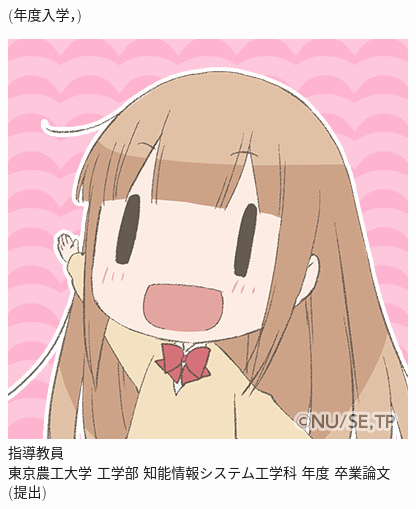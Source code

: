 \documentclass[main]{subfiles}
\begin{document}
\begin{titlepage}
    \centering
    ~\\[10mm]
    {\LARGE \titleJaLarge}
    \\[3mm]
    {\LARGE \titleEnLarge}\\[25mm]

    {\Large 
    \myNameJa
    }\\
    {\large \myNameEn
    \\[5mm]
    (\yearOfEnrollment 年度入学，\studentNumber)\\[5mm]}

    \includegraphics[width=0.25\linewidth]{figures/hyoushi_shashin.jpg}\\[5mm]

    {\Large 指導教員　\teacherName\\[25mm]}
    {\large 東京農工大学 工学部 知能情報システム工学科 \yearOfGraduation 年度 卒業論文\\[5mm]}
    {\large(\dateOfSubmission 提出)}

\end{titlepage}
\end{document}
